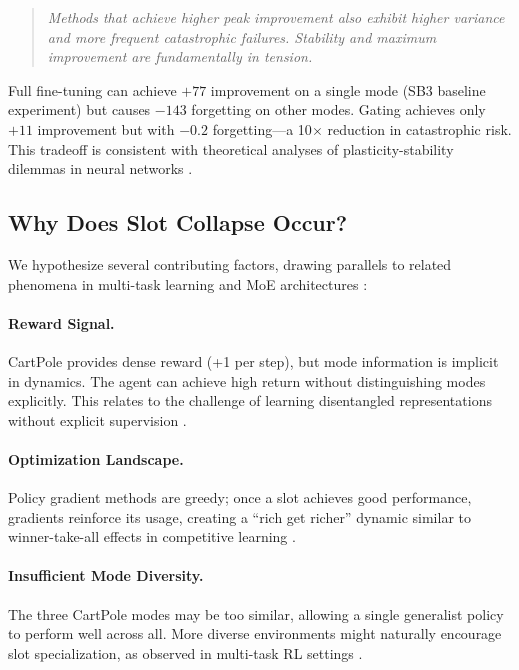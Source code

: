 \documentclass{article}
\begin{document}
\begin{quote}
\emph{Methods that achieve higher peak improvement also exhibit higher variance and more frequent catastrophic failures. Stability and maximum improvement are fundamentally in tension.}
\end{quote}

Full fine-tuning can achieve $+77$ improvement on a single mode (SB3 baseline experiment) but causes $-143$ forgetting on other modes. Gating achieves only $+11$ improvement but with $-0.2$ forgetting---a 10$\times$ reduction in catastrophic risk. This tradeoff is consistent with theoretical analyses of plasticity-stability dilemmas in neural networks \citep{mccloskey1989catastrophic, french1999catastrophic}.

\subsection{Why Does Slot Collapse Occur?}

We hypothesize several contributing factors, drawing parallels to related phenomena in multi-task learning and MoE architectures \citep{shazeer2017outrageously, jacobs1991adaptive}:

\paragraph{Reward Signal.} CartPole provides dense reward (+1 per step), but mode information is implicit in dynamics. The agent can achieve high return without distinguishing modes explicitly. This relates to the challenge of learning disentangled representations without explicit supervision \citep{locatello2020object}.

\paragraph{Optimization Landscape.} Policy gradient methods \citep{schulman2017proximal} are greedy; once a slot achieves good performance, gradients reinforce its usage, creating a ``rich get richer'' dynamic similar to winner-take-all effects in competitive learning \citep{jacobs1991adaptive}.

\paragraph{Insufficient Mode Diversity.} The three CartPole modes may be too similar, allowing a single generalist policy to perform well across all. More diverse environments might naturally encourage slot specialization, as observed in multi-task RL settings \citep{sodhani2021multi}.
\end{document}
